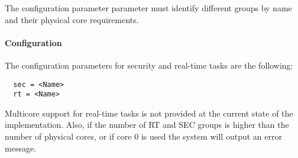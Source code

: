 The configuration parameter parameter must identify different groups by name
and their physical core requirements.




\paragraph{Configuration}
The configuration parameters for security and real-time tasks are the
following:
\begin{lstlisting}
  sec = <Name>
  rt = <Name>
\end{lstlisting}
Multicore support for real-time tasks is not provided at the current state of
the implementation.
Also, if the number of RT and SEC groups is higher than the number of physical
cores, or if core 0 is used the system will output an error message.
